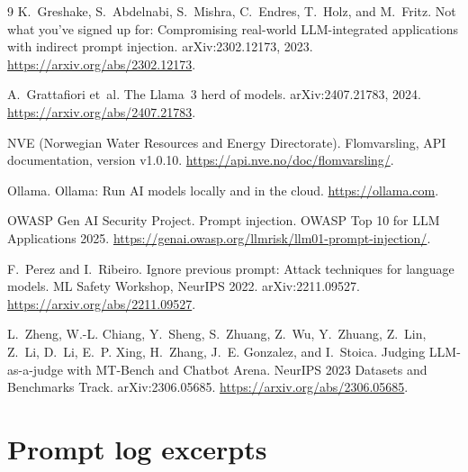 \documentclass{article}
\begin{document}
\label{end:body}\par{}
\begingroup
\small
\begin{thebibliography}{9}
\setlength{\itemsep}{1pt}
K.~Greshake, S.~Abdelnabi, S.~Mishra, C.~Endres, T.~Holz, and M.~Fritz.
\newblock Not what you've signed up for: Compromising real-world {LLM}-integrated applications with indirect prompt injection.
\newblock arXiv:2302.12173, 2023. \url{https://arxiv.org/abs/2302.12173}.

A.~Grattafiori et~al.
\newblock The {Llama}~3 herd of models.
\newblock arXiv:2407.21783, 2024. \url{https://arxiv.org/abs/2407.21783}.

NVE (Norwegian Water Resources and Energy Directorate).
\newblock Flomvarsling, API documentation, version v1.0.10.
\newblock \url{https://api.nve.no/doc/flomvarsling/}.

Ollama.
\newblock Ollama: Run AI models locally and in the cloud.
\newblock \url{https://ollama.com}.

OWASP Gen AI Security Project.
 Prompt injection. {OWASP} Top 10 for {LLM} Applications 2025.
\newblock \url{https://genai.owasp.org/llmrisk/llm01-prompt-injection/}.

F.~Perez and I.~Ribeiro.
\newblock Ignore previous prompt: Attack techniques for language models.
\newblock ML Safety Workshop, NeurIPS 2022. arXiv:2211.09527. \url{https://arxiv.org/abs/2211.09527}.

L.~Zheng, W.-L. Chiang, Y.~Sheng, S.~Zhuang, Z.~Wu, Y.~Zhuang, Z.~Lin, Z.~Li, D.~Li, E.~P. Xing, H.~Zhang, J.~E. Gonzalez, and I.~Stoica.
\newblock Judging {LLM}-as-a-judge with {MT-Bench} and {Chatbot Arena}.
\newblock NeurIPS 2023 Datasets and Benchmarks Track. arXiv:2306.05685. \url{https://arxiv.org/abs/2306.05685}.
\end{thebibliography}
\endgroup

\label{end:main}
\newpage
\appendix

\section{Prompt log excerpts}
\label{app:promptlog}
\end{document}
